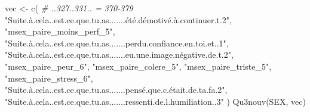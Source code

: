 \documentclass[
]{article}
\newenvironment{Shaded}{\begin{snugshade}}{\end{snugshade}}
\newcommand{\CommentTok}[1]{\textcolor[rgb]{0.56,0.35,0.01}{\textit{#1}}}
\newcommand{\FunctionTok}[1]{\textcolor[rgb]{0.00,0.00,0.00}{#1}}
\newcommand{\NormalTok}[1]{#1}
\newcommand{\OtherTok}[1]{\textcolor[rgb]{0.56,0.35,0.01}{#1}}
\newcommand{\StringTok}[1]{\textcolor[rgb]{0.31,0.60,0.02}{#1}}
\begin{document}
\begin{Shaded}
\begin{Highlighting}[]
\NormalTok{vec }\OtherTok{\textless{}{-}} \FunctionTok{c}\NormalTok{(  }\CommentTok{\# ..327..331.. = 370{-}379}
  \StringTok{"Suite.à.cela..est.ce.que.tu.as.......été.démotivé.à.continuer.t.2"}\NormalTok{,}
  \StringTok{"msex\_paire\_moins\_perf\_5"}\NormalTok{,}
  \StringTok{"Suite.à.cela..est.ce.que.tu.as.......perdu.confiance.en.toi.et..1"}\NormalTok{,}
  \StringTok{"Suite.à.cela..est.ce.que.tu.as.......eu.une.image.négative.de.t.2"}\NormalTok{,}
  \StringTok{"msex\_paire\_peur\_6"}\NormalTok{,}
  \StringTok{"msex\_paire\_colere\_5"}\NormalTok{,}
  \StringTok{"msex\_paire\_triste\_5"}\NormalTok{,}
  \StringTok{"msex\_paire\_stress\_6"}\NormalTok{,}
  \StringTok{"Suite.à.cela..est.ce.que.tu.as.......pensé.que.c.était.de.ta.fa.2"}\NormalTok{,}
  \StringTok{"Suite.à.cela..est.ce.que.tu.as.......ressenti.de.l.humiliation..3"}
\NormalTok{  )}
\FunctionTok{Qu3nouv}\NormalTok{(SEX, vec)}
\end{Highlighting}
\end{Shaded}
\end{document}
